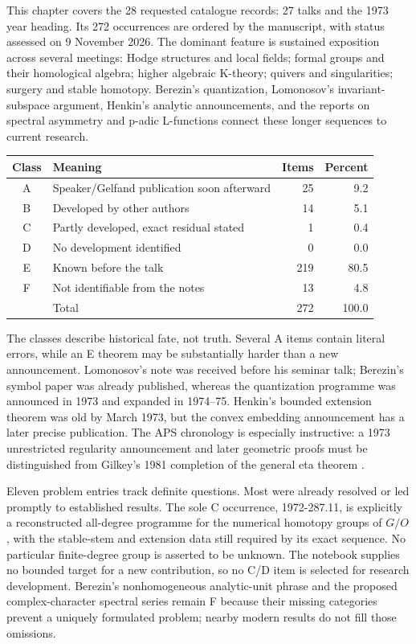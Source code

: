 This chapter covers the 28 requested catalogue records: 27 talks and the 1973 year heading. Its 272 occurrences are ordered by the manuscript, with status assessed on 9 November 2026. The dominant feature is sustained exposition across several meetings: Hodge structures and local fields; formal groups and their homological algebra; higher algebraic K-theory; quivers and singularities; surgery and stable homotopy. Berezin's quantization, Lomonosov's invariant-subspace argument, Henkin's analytic announcements, and the reports on spectral asymmetry and p-adic L-functions connect these longer sequences to current research.

\begin{center}\small
\begin{tabular}{@{}clrr@{}}\toprule
Class & Meaning & Items & Percent\\\midrule
A & Speaker/Gelfand publication soon afterward & 25 & 9.2\\
B & Developed by other authors & 14 & 5.1\\
C & Partly developed, exact residual stated & 1 & 0.4\\
D & No development identified & 0 & 0.0\\
E & Known before the talk & 219 & 80.5\\
F & Not identifiable from the notes & 13 & 4.8\\
\midrule & Total & 272 & 100.0\\\bottomrule
\end{tabular}
\end{center}

The classes describe historical fate, not truth. Several A items contain literal errors, while an E theorem may be substantially harder than a new announcement. Lomonosov's note was received before his seminar talk; Berezin's symbol paper was already published, whereas the quantization programme was announced in 1973 and expanded in 1974--75. Henkin's bounded extension theorem was old by March 1973, but the convex embedding announcement has a later precise publication. The APS chronology is especially instructive: a 1973 unrestricted regularity announcement and later geometric proofs must be distinguished from Gilkey's 1981 completion of the general eta theorem \citep{lomonosov1973invariant,berezin1972symbols,henkin1972continuation,atiyahpatodisinger1976spectral3,gilkey1981residue}.

Eleven problem entries track definite questions. Most were already resolved or led promptly to established results. The sole C occurrence, 1972-287.11, is explicitly a reconstructed all-degree programme for the numerical homotopy groups of \(G/O\), with the stable-stem and extension data still required by its exact sequence. No particular finite-degree group is asserted to be unknown. The notebook supplies no bounded target for a new contribution, so no C/D item is selected for research development. Berezin's nonhomogeneous analytic-unit phrase and the proposed complex-character spectral series remain F because their missing categories prevent a uniquely formulated problem; nearby modern results do not fill those omissions.

